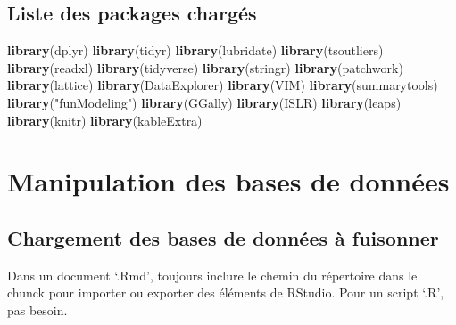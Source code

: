 \documentclass[7pt,]{report}
\newenvironment{Shaded}{\begin{snugshade}}{\end{snugshade}}
\newcommand{\KeywordTok}[1]{\textcolor[rgb]{0.13,0.29,0.53}{\textbf{#1}}}
\newcommand{\NormalTok}[1]{#1}
\newcommand{\StringTok}[1]{\textcolor[rgb]{0.31,0.60,0.02}{#1}}
\begin{document}
\hypertarget{liste-des-packages-charguxe9s}{%
\section{Liste des packages chargés}\label{liste-des-packages-charguxe9s}}

\begin{Shaded}
\begin{Highlighting}[]
\KeywordTok{library}\NormalTok{(dplyr)}
\KeywordTok{library}\NormalTok{(tidyr)}
\KeywordTok{library}\NormalTok{(lubridate)}
\KeywordTok{library}\NormalTok{(tsoutliers)}
\KeywordTok{library}\NormalTok{(readxl)}
\KeywordTok{library}\NormalTok{(tidyverse)}
\KeywordTok{library}\NormalTok{(stringr)}
\KeywordTok{library}\NormalTok{(patchwork)}
\KeywordTok{library}\NormalTok{(lattice)}
\KeywordTok{library}\NormalTok{(DataExplorer) }
\KeywordTok{library}\NormalTok{(VIM)}
\KeywordTok{library}\NormalTok{(summarytools)}
\KeywordTok{library}\NormalTok{(}\StringTok{"funModeling"}\NormalTok{)}
\KeywordTok{library}\NormalTok{(GGally)}
\KeywordTok{library}\NormalTok{(ISLR)}
\KeywordTok{library}\NormalTok{(leaps)}
\KeywordTok{library}\NormalTok{(knitr)}
\KeywordTok{library}\NormalTok{(kableExtra)}
\end{Highlighting}
\end{Shaded}

\hypertarget{manipulation-des-bases-de-donnuxe9es}{%
\chapter{Manipulation des bases de données}\label{manipulation-des-bases-de-donnuxe9es}}

\hypertarget{chargement-des-bases-de-donnuxe9es-uxe0-fuisonner}{%
\section{Chargement des bases de données à fuisonner}\label{chargement-des-bases-de-donnuxe9es-uxe0-fuisonner}}

Dans un document `.Rmd', toujours inclure le chemin du répertoire dans le chunck pour importer ou exporter des éléments de RStudio. Pour un script `.R', pas besoin.
\end{document}
